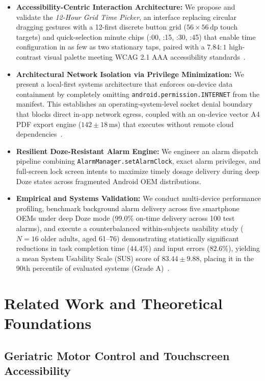 \documentclass[11pt,a4paper]{article}
\begin{document}
\begin{itemize}[leftmargin=*]
    \item \textbf{Accessibility-Centric Interaction Architecture:} We propose and validate the \emph{12-Hour Grid Time Picker}, an interface replacing circular dragging gestures with a 12-first discrete button grid ($56\times56\,\text{dp}$ touch targets) and quick-selection minute chips (:00, :15, :30, :45) that enable time configuration in as few as two stationary taps, paired with a $7.84:1$ high-contrast visual palette meeting WCAG 2.1 AAA accessibility standards~\cite{w3c2018wcag}.
    \item \textbf{Architectural Network Isolation via Privilege Minimization:} We present a local-first systems architecture that enforces on-device data containment by completely omitting \texttt{android.permission.INTERNET} from the manifest. This establishes an operating-system-level socket denial boundary that blocks direct in-app network egress, coupled with an on-device vector A4 PDF export engine ($142 \pm 18\,\text{ms}$) that executes without remote cloud dependencies~\cite{kleppmann2019local}.
    \item \textbf{Resilient Doze-Resistant Alarm Engine:} We engineer an alarm dispatch pipeline combining \texttt{AlarmManager.setAlarmClock}, exact alarm privileges, and full-screen lock screen intents to maximize timely dosage delivery during deep Doze states across fragmented Android OEM distributions.
    \item \textbf{Empirical and Systems Validation:} We conduct multi-device performance profiling, benchmark background alarm delivery across five smartphone OEMs under deep Doze mode (99.0\% on-time delivery across 100 test alarms), and execute a counterbalanced within-subjects usability study ($N=16$ older adults, aged 61--76) demonstrating statistically significant reductions in task completion time ($44.4\%$) and input errors ($82.6\%$), yielding a mean System Usability Scale (SUS) score of $83.44 \pm 9.88$, placing it in the 90th percentile of evaluated systems (Grade A)~\cite{brooke1996sus,bangor2008empirical}.
\end{itemize}

\section{Related Work and Theoretical Foundations}
\label{sec:related_work}

\subsection{Geriatric Motor Control and Touchscreen Accessibility}
\end{document}
